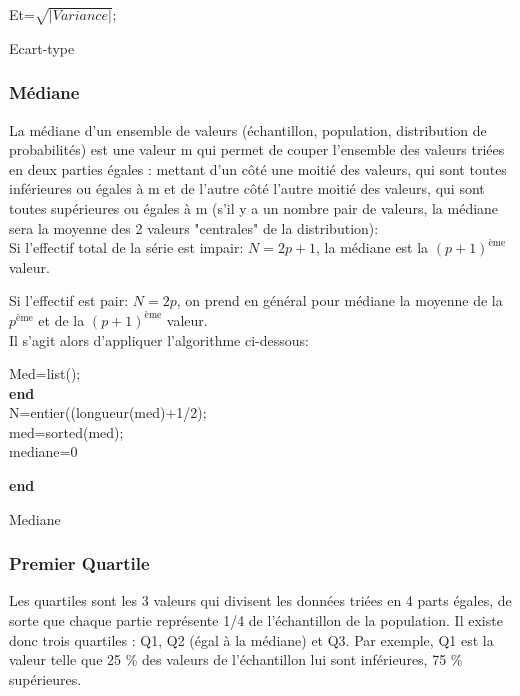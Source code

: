         \begin{algorithm}[H]
         \SetAlgoLined
          Et=$\sqrt{|Variance|}$;\;
          
 \caption{Ecart-type}
\end{algorithm}

\subsubsection{Médiane}

La médiane d'un ensemble de valeurs (échantillon, population,
distribution de probabilités) est une valeur m qui permet de couper
l'ensemble des valeurs triées en deux parties égales : mettant d'un côté
une moitié des valeurs, qui sont toutes inférieures ou égales à m et de
l'autre côté l'autre moitié des valeurs, qui sont toutes supérieures ou
égales à m (s'il y a un nombre pair de valeurs, la médiane sera la
moyenne des 2 valeurs "centrales" de la distribution): \\

    Si l'effectif total de la série est impair: $N=2p+1$, 
  la médiane est la $(p+1)^{\text{ème}}$ valeur.\;

  Si l'effectif est pair: $N=2p$, on prend en général pour médiane la
  moyenne de la $p^{\text{ème}}$ et de la $(p+1)^{\text{ème}}$ valeur. \\
  
  Il s'agit alors d'appliquer l'algorithme ci-dessous:\\

         \begin{algorithm}[H]
          Med=list();\\
         \textbf{end}\\  
         N=entier((longueur(med)+1/2);\\
         med=sorted(med);\\
         mediane=0
         
         \textbf{end}
         
         \caption{Mediane}
         
        \end{algorithm}
        \subsubsection{Premier Quartile}
        Les quartiles sont les 3 valeurs qui divisent les données triées en 4 parts égales, de sorte que chaque partie représente 1/4 de l'échantillon de la population. Il existe donc trois quartiles : Q1, Q2 (égal à la  médiane) et Q3. Par exemple, Q1 est la valeur telle que 25 \% des valeurs de l'échantillon lui sont inférieures, 75 \% supérieures.\\
        
